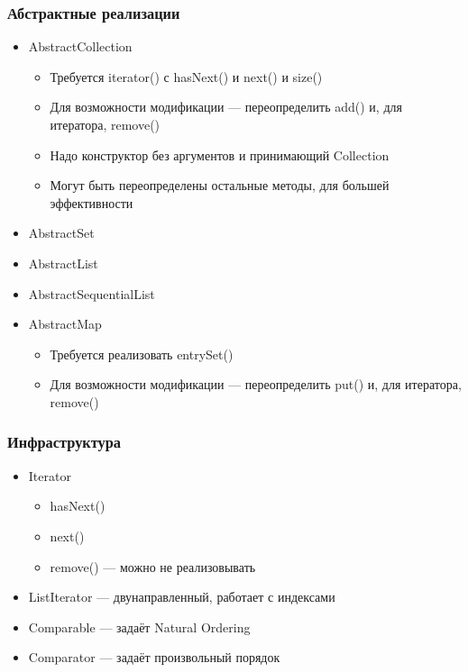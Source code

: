 \documentclass[xetex,mathserif,serif]{beamer}
\begin{document}
	\begin{frame}
		\frametitle{Абстрактные реализации}
		\begin{itemize}
			\item AbstractCollection
			\begin{itemize}
				\item Требуется iterator() с hasNext() и next() и size()
				\item Для возможности модификации --- переопределить add() и, для итератора, remove()
				\item Надо конструктор без аргументов и принимающий Collection
				\item Могут быть переопределены остальные методы, для большей эффективности
			\end{itemize}
			\item AbstractSet
			\item AbstractList
			\item AbstractSequentialList
			\item AbstractMap
			\begin{itemize}
				\item Требуется реализовать entrySet()
				\item Для возможности модификации --- переопределить put() и, для итератора, remove()
			\end{itemize}
		\end{itemize}
	\end{frame}

	\begin{frame}
		\frametitle{Инфраструктура}
		\begin{itemize}
			\item Iterator
			\begin{itemize}
				\item hasNext()
				\item next()
				\item remove() --- можно не реализовывать
			\end{itemize}
			\item ListIterator --- двунаправленный, работает с индексами
			\item Comparable --- задаёт Natural Ordering
			\item Comparator --- задаёт произвольный порядок
		\end{itemize}
	\end{frame}
\end{document}
